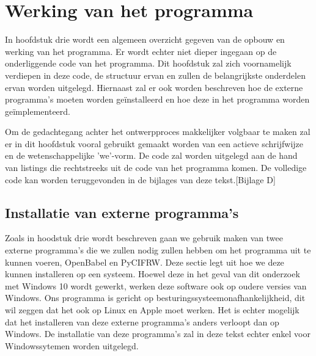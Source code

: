 

\chapter{Werking van het programma}

In hoofdstuk drie wordt een algemeen overzicht gegeven van de opbouw en werking van het programma. Er wordt echter niet dieper ingegaan op de onderliggende code van het programma. Dit hoofdstuk zal zich voornamelijk verdiepen in deze code, de structuur ervan en zullen de belangrijkste onderdelen ervan worden uitgelegd. Hiernaast zal er ook worden beschreven hoe de externe programma's moeten worden geïnstalleerd en hoe deze in het programma worden geïmplementeerd. 
\par
Om de gedachtegang achter het ontwerpproces makkelijker volgbaar te maken zal er in dit hoofdstuk vooral gebruikt gemaakt worden van een actieve schrijfwijze en de wetenschappelijke 'we'-vorm. De code zal worden uitgelegd aan de hand van listings die rechtstreeks uit de code van het programma komen. De volledige code kan worden teruggevonden in de bijlages van deze tekst.[Bijlage D]
\par


\section{Installatie van externe programma's}
Zoals in hoodstuk drie wordt beschreven gaan we gebruik maken van twee externe programma's die we zullen nodig zullen hebben om het programma uit te kunnen voeren, OpenBabel en PyCIFRW. Deze sectie legt uit hoe we deze kunnen installeren op een systeem. Hoewel deze in het geval van dit onderzoek met Windows 10 wordt gewerkt, werken deze software ook op oudere versies van Windows. Ons programma is gericht op besturingssysteemonafhankelijkheid, dit wil zeggen dat het ook op Linux en Apple moet werken. Het is echter mogelijk dat het installeren van deze externe programma's anders verloopt dan op Windows. De installatie van deze programma's zal in deze tekst echter enkel voor Windowssytemen worden uitgelegd.

